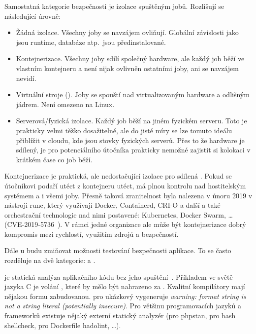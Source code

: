         Samostatná kategorie bezpečnosti \CI je izolace spuštěným jobů. Rozlišují se následující úrovně:
        \begin{itemize}
            \item Žádná izolace. Všechny joby se navzájem ovliňují. Globální závislosti jako jsou runtime, databáze atp.~jsou předinstalované.
            \item Kontejnerizace. Všechny joby sdílí společný hardware, ale každý job běží ve vlastním kontejneru a není nijak ovlivněn ostatními joby, ani se navzájem nevidí.
            \item Virtuální stroje (). Joby se spouští nad virtualizovaným hardware a odlišným jádrem. Není omezeno na Linux.
            \item Serverová/fyzická izolace. Každý job běží na jiném fyzickém serveru. Toto je prakticky velmi těžko dosažitelné, ale do jisté míry se lze tomuto ideálu přiblížit v cloudu, kde jsou stovky fyzických serverů. Přes to že hardware je sdílený, je pro potenciálního útočníka prakticky nemožné zajistit si kolokaci v krátkém čase co job běží.
        \end{itemize}

        Kontejnerizace je praktická, ale nedostačující izolace pro sdílená \CI. Pokud se útočníkovi podaří utéct z kontejneru utéct, má plnou kontrolu nad hostitelským systémem a i všemi joby. Přesně taková zranitelnost byla nalezena v únoru 2019 v nástroji runc, který využívají Docker, Containerd, CRI-O a další a také orchestrační technologie nad nimi postavené: Kubernetes, Docker Swarm, … (CVE-2019-5736~\cite{CVE-2019-5736}). V rámci jedné organizace ale může být kontejnerizace dobrý kompromis mezi rychlostí, využitím zdrojů a bezpečností.

        Dále u \CI budu zmiňovat možnosti testování bezpečnosti aplikace. To se často rozděluje na dvě kategorie:  a .

        \label{sast-dast}
         je statická analýza aplikačního kódu bez jeho spuštění~\cite{sast}. Příkladem ve světě jazyka C je volání , které by mělo být nahrazeno za . Kvalitní kompilátory mají nějakou formu  zabudovanou.  pro ukázkový  vygeneruje \textit{warning: format string is not a string literal (potentially insecure)}. Pro většinu programovacích jazyků a frameworků existuje nějaký externí statický analyzér (pro  phpstan, pro bash shellcheck, pro Dockerfile hadolint, …).

